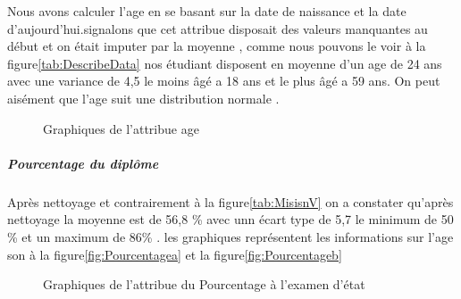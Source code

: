 Nous avons calculer l'age en se basant sur la date de naissance et la date d'aujourd'hui.signalons que cet attribue disposait des valeurs manquantes au début et on était imputer par la moyenne , comme nous pouvons le voir à la figure\ref{tab:DescribeData}  nos étudiant disposent en moyenne d'un age de 24 ans avec une variance de 4,5 le moins âgé a 18 ans et le plus âgé a 59 ans.
On peut aisément que l'age suit une distribution normale . 
\begin{figure}[!htbp]
	\centering
	\hfill
	\hfill
	\caption{Graphiques de l'attribue age}
\end{figure}
\subparagraph{Pourcentage du diplôme}
Après nettoyage et contrairement à la figure\ref{tab:MisisnV} on a constater qu'après nettoyage la moyenne est de 56,8 \% avec unn écart type de 5,7 le minimum de 50 \% et un maximum de 86\% .
les graphiques représentent les informations sur l'age  son à la figure\ref{fig:Pourcentagea} et la figure\ref{fig:Pourcentageb}
\begin{figure}[!htbp]
	\centering
	\hfill
	\hfill
	\caption{Graphiques de l'attribue du Pourcentage à l'examen d'état }
\end{figure}

